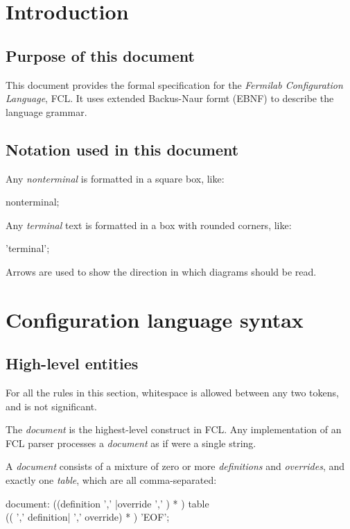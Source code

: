\documentclass{memarticle}
\begin{document}
\topmatter
\chapter{Introduction}

\section{Purpose of this document}
This document provides the formal specification
for the \emph{Fermilab Configuration Language},
FCL.
It uses extended Backus-Naur formt (EBNF) to describe the language grammar.

\section{Notation used in this document}

Any \emph{nonterminal} is formatted in a square box, like:
\begin{rail}
  nonterminal;
\end{rail}

Any \emph{terminal} text is formatted in a box with rounded corners, like:
\begin{rail}
  'terminal';
\end{rail}


Arrows are used to show the direction in which diagrams should be read.

\chapter{Configuration language syntax}

\section{High-level entities}

For all the rules in this section,
whitespace is allowed between any two tokens,
and is not significant.

The \emph{document} is the highest-level construct
in FCL.
Any implementation of an FCL parser
processes a \emph{document}
as if were a single string.

A \emph{document} consists of a mixture of
zero or more \emph{definitions}
and \emph{overrides},
and exactly one \emph{table},
which are all comma-separated:
\begin{rail}
document: ((definition ',' |override ',' ) * )  table \\ (( ',' definition| ',' override) * ) 'EOF';
\end{rail}
\end{document}
